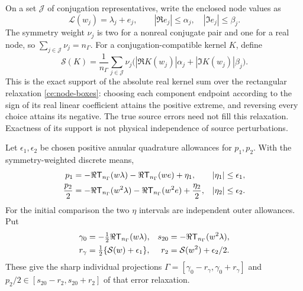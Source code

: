 On a set $\mathcal J$ of conjugation representatives, write the enclosed
node values as
\begin{equation}
 \mathcal L(w_j)=\lambda_j+e_j,\qquad
 |\Re e_j|\le\alpha_j,\quad |\Im e_j|\le\beta_j.
 \label{ce:node-boxes}
\end{equation}
The symmetry weight $\nu_j$ is two for a nonreal conjugate pair and one
for a real node, so $\sum_{j\in\mathcal J}\nu_j=n_\Gamma$.
For a conjugation-compatible kernel $K$, define
\begin{equation}
 \mathcal S(K)=\frac1{n_\Gamma}\sum_{j\in\mathcal J}\nu_j
 \bigl(|\Re K(w_j)|\alpha_j+|\Im K(w_j)|\beta_j\bigr).
 \label{ce:box-support}
\end{equation}
This is the exact support of the absolute real kernel sum over the
rectangular relaxation \eqref{ce:node-boxes}: choosing each component
endpoint according to the sign of its real linear coefficient attains
the positive extreme, and reversing every choice attains its negative.
The true source errors need not fill this relaxation. Exactness of its
support is not physical independence of source perturbations.

Let $\epsilon_1,\epsilon_2$ be chosen positive annular quadrature
allowances for $p_1,p_2$. With the symmetry-weighted discrete means,
\begin{align}
 p_1&=-\Re\mathsf T_{n_\Gamma}(w\lambda)
      -\Re\mathsf T_{n_\Gamma}(we)+\eta_1,
 &|\eta_1|&\le\epsilon_1,\notag\\
 \frac{p_2}{2}&=-\Re\mathsf T_{n_\Gamma}(w^2\lambda)
      -\Re\mathsf T_{n_\Gamma}(w^2e)+\frac{\eta_2}{2},
 &|\eta_2|&\le\epsilon_2.
 \label{ce:moment-errors}
\end{align}
For the initial comparison the two $\eta$ intervals are independent
outer allowances. Put
\begin{align}
 \gamma_0&=-\tfrac12\Re\mathsf T_{n_\Gamma}(w\lambda),
 &s_{20}&=-\Re\mathsf T_{n_\Gamma}(w^2\lambda),\notag\\
 r_\gamma&=\tfrac12\{\mathcal S(w)+\epsilon_1\},
 &r_2&=\mathcal S(w^2)+\epsilon_2/2.
 \label{ce:marginals}
\end{align}
These give the sharp individual projections
$\Gamma=[\gamma_0-r_\gamma,\gamma_0+r_\gamma]$ and
$p_2/2\in[s_{20}-r_2,s_{20}+r_2]$ of that error relaxation.

